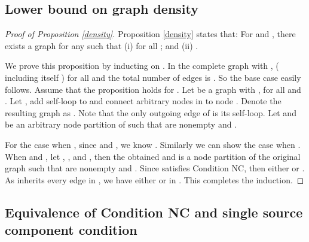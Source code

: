 \documentclass[letterpaper, 11pt]{article}
\begin{document}
\subsection{Lower bound on graph density}
\begin{proof}[Proof of Proposition \ref{density}]
Proposition \ref{density} states that: For  and , there exists a graph  for any  such that
(i)  for all ; and
(ii) .

We prove this proposition by inducting on .
In the complete graph with ,  ( including  itself ) for all  and the total number of edges is . So the base case easily follows. Assume that the proposition holds for . Let  be a graph with ,   for all  and . Let , add self-loop to  and connect arbitrary  nodes in  to node . Denote the resulting graph as . Note that the only outgoing edge of  is its self-loop.  Let  and  be an arbitrary node partition of  such that  are nonempty and .


For the case when , since  and , we know . Similarly we can show the case when . When  and , let , ,  and , then the obtained  and  is a node partition of the original graph  such that  are nonempty and . Since  satisfies Condition NC, then either  or . As  inherits every edge in , we have either  or  in . This completes the induction.
\end{proof}







\subsection{Equivalence of Condition NC and single source component condition}\label{app:equi}
\end{document}
